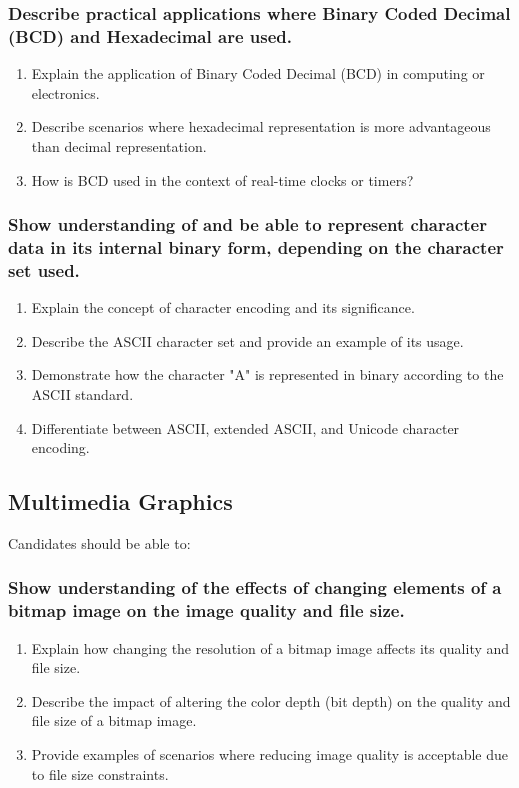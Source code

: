 \documentclass[a4paper]{article}
\begin{document}
\subsubsection{Describe practical applications where Binary Coded Decimal (BCD) and Hexadecimal are used.}
\begin{enumerate}
  \item Explain the application of Binary Coded Decimal (BCD) in computing or electronics.
  \item Describe scenarios where hexadecimal representation is more advantageous than decimal representation.
  \item How is BCD used in the context of real-time clocks or timers?
\end{enumerate}

\subsubsection{Show understanding of and be able to represent character data in its internal binary form, depending on the character set used.}
\begin{enumerate}
  \item Explain the concept of character encoding and its significance.
  \item Describe the ASCII character set and provide an example of its usage.
  \item Demonstrate how the character "A" is represented in binary according to the ASCII standard.
  \item Differentiate between ASCII, extended ASCII, and Unicode character encoding.
\end{enumerate}

\subsection{Multimedia Graphics}
Candidates should be able to:
\subsubsection{Show understanding of the effects of changing elements of a bitmap image on the image quality and file size.}
\begin{enumerate}
  \item Explain how changing the resolution of a bitmap image affects its quality and file size.
  \item Describe the impact of altering the color depth (bit depth) on the quality and file size of a bitmap image.
  \item Provide examples of scenarios where reducing image quality is acceptable due to file size constraints.
\end{enumerate}
\end{document}
